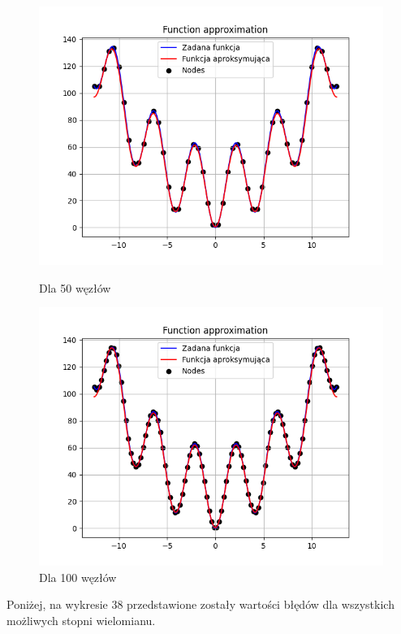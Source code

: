 \documentclass{article}
\begin{document}
\begin{figure}[H]
\begin{minipage}[b]{0.49\textwidth}
    \begin{minipage}[b]{\textwidth}
      \includegraphics[width=\textwidth]{img36.png}
      \caption{Dla 50 węzłów}
    \end{minipage}
    \vspace*{\fill}
    \begin{minipage}[b]{\textwidth}
      \includegraphics[width=\textwidth]{img37.png}
      \caption{Dla 100 węzłów}
    \end{minipage}
  \end{minipage}
\end{figure}

\noindent
Poniżej, na wykresie 38 przedstawione zostały wartości błędów dla wszystkich możliwych stopni wielomianu.
\end{document}
